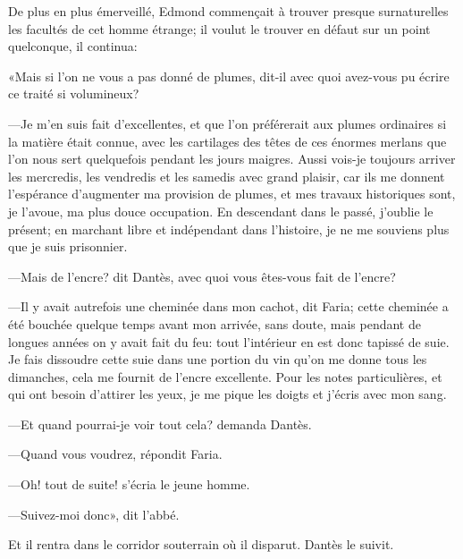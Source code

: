 De plus en plus émerveillé, Edmond commençait à trouver presque surnaturelles les facultés de cet homme étrange; il voulut le trouver en défaut sur un point quelconque, il continua:

«Mais si l'on ne vous a pas donné de plumes, dit-il avec quoi avez-vous pu écrire ce traité si volumineux?

—Je m'en suis fait d'excellentes, et que l'on préférerait aux plumes ordinaires si la matière était connue, avec les cartilages des têtes de ces énormes merlans que l'on nous sert quelquefois pendant les jours maigres. Aussi vois-je toujours arriver les mercredis, les vendredis et les samedis avec grand plaisir, car ils me donnent l'espérance d'augmenter ma provision de plumes, et mes travaux historiques sont, je l'avoue, ma plus douce occupation. En descendant dans le passé, j'oublie le présent; en marchant libre et indépendant dans l'histoire, je ne me souviens plus que je suis prisonnier.

—Mais de l'encre? dit Dantès, avec quoi vous êtes-vous fait de l'encre?

—Il y avait autrefois une cheminée dans mon cachot, dit Faria; cette cheminée a été bouchée quelque temps avant mon arrivée, sans doute, mais pendant de longues années on y avait fait du feu: tout l'intérieur en est donc tapissé de suie. Je fais dissoudre cette suie dans une portion du vin qu'on me donne tous les dimanches, cela me fournit de l'encre excellente. Pour les notes particulières, et qui ont besoin d'attirer les yeux, je me pique les doigts et j'écris avec mon sang.

—Et quand pourrai-je voir tout cela? demanda Dantès.

—Quand vous voudrez, répondit Faria.

—Oh! tout de suite! s'écria le jeune homme.

—Suivez-moi donc», dit l'abbé.

Et il rentra dans le corridor souterrain où il disparut. Dantès le suivit.



